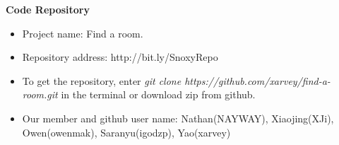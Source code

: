 \documentclass[50pt|a4paper]{letter}
\begin{document}
\centerline{\Large{\bf Code Repository}}
\bigskip

\begin{itemize}

\item Project name: Find a room.
\item Repository address: http://bit.ly/SnoxyRepo
\item To get the repository, enter \textit{git clone https://github.com/xarvey/find-a-room.git} in the terminal or download zip from github. 
\item Our member and github user name: Nathan(NAYWAY), Xiaojing(XJi), Owen(owenmak), Saranyu(igodzp), Yao(xarvey)


\end{itemize}
\end{document}
